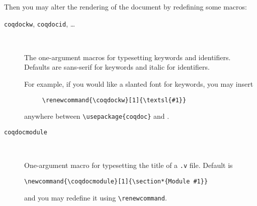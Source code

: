 Then you may alter the rendering of the document by
redefining some macros:
\begin{description}

\item[\texttt{coqdockw}, \texttt{coqdocid}, \ldots] ~ 
  
  The one-argument macros for typesetting keywords and identifiers.
  Defaults are sans-serif for keywords and italic for identifiers.

  For example, if you would like a slanted font for keywords, you
  may insert  
\begin{verbatim}
     \renewcommand{\coqdockw}[1]{\textsl{#1}}
\end{verbatim}
  anywhere between \verb|\usepackage{coqdoc}| and
  \verb||. 

\item[\texttt{coqdocmodule}] ~ 
  
  One-argument macro for typesetting the title of a \verb|.v| file.
  Default is
\begin{verbatim}
\newcommand{\coqdocmodule}[1]{\section*{Module #1}}
\end{verbatim}
  and you may redefine it using \verb|\renewcommand|.

\end{description}


